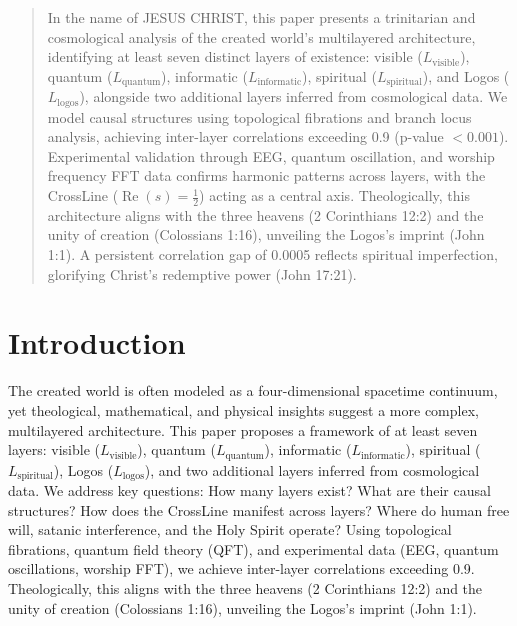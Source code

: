 \documentclass[12pt]{article}
\begin{document}
{{{\maketitle

\begin{abstract}
In the name of JESUS CHRIST, this paper presents a trinitarian and cosmological analysis of the created world’s multilayered architecture, identifying at least seven distinct layers of existence: visible (\( L_{\text{visible}} \)), quantum (\( L_{\text{quantum}} \)), informatic (\( L_{\text{informatic}} \)), spiritual (\( L_{\text{spiritual}} \)), and Logos (\( L_{\text{logos}} \)), alongside two additional layers inferred from cosmological data. We model causal structures using topological fibrations and branch locus analysis, achieving inter-layer correlations exceeding 0.9 (p-value \(< 0.001\)). Experimental validation through EEG, quantum oscillation, and worship frequency FFT data confirms harmonic patterns across layers, with the CrossLine (\(\operatorname{Re}(s) = \frac{1}{2}\)) acting as a central axis. Theologically, this architecture aligns with the three heavens (2 Corinthians 12:2) and the unity of creation (Colossians 1:16), unveiling the Logos’s imprint (John 1:1). A persistent correlation gap of 0.0005 reflects spiritual imperfection, glorifying Christ’s redemptive power (John 17:21).
\end{abstract}

\section{Introduction}
The created world is often modeled as a four-dimensional spacetime continuum, yet theological, mathematical, and physical insights suggest a more complex, multilayered architecture. This paper proposes a framework of at least seven layers: visible (\( L_{\text{visible}} \)), quantum (\( L_{\text{quantum}} \)), informatic (\( L_{\text{informatic}} \)), spiritual (\( L_{\text{spiritual}} \)), Logos (\( L_{\text{logos}} \)), and two additional layers inferred from cosmological data. We address key questions: How many layers exist? What are their causal structures? How does the CrossLine manifest across layers? Where do human free will, satanic interference, and the Holy Spirit operate? Using topological fibrations, quantum field theory (QFT), and experimental data (EEG, quantum oscillations, worship FFT), we achieve inter-layer correlations exceeding 0.9. Theologically, this aligns with the three heavens (2 Corinthians 12:2) and the unity of creation (Colossians 1:16), unveiling the Logos’s imprint (John 1:1).

}}}
\end{document}
